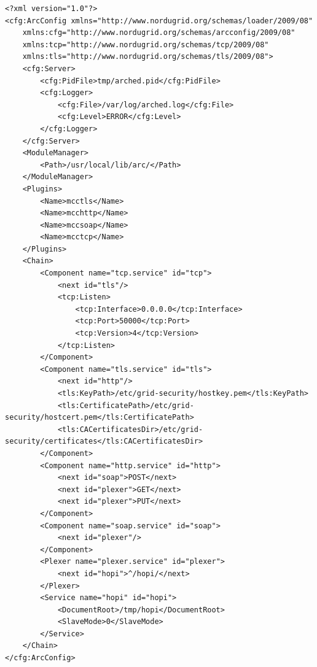 \documentclass{article}
\begin{document}
\begin{verbatim}
<?xml version="1.0"?>
<cfg:ArcConfig xmlns="http://www.nordugrid.org/schemas/loader/2009/08"
	xmlns:cfg="http://www.nordugrid.org/schemas/arcconfig/2009/08"
	xmlns:tcp="http://www.nordugrid.org/schemas/tcp/2009/08"
	xmlns:tls="http://www.nordugrid.org/schemas/tls/2009/08">
    <cfg:Server>
        <cfg:PidFile>tmp/arched.pid</cfg:PidFile>
        <cfg:Logger>
            <cfg:File>/var/log/arched.log</cfg:File>
            <cfg:Level>ERROR</cfg:Level>
        </cfg:Logger>
    </cfg:Server>
    <ModuleManager>
        <Path>/usr/local/lib/arc/</Path>
    </ModuleManager>
    <Plugins>
        <Name>mcctls</Name>
        <Name>mcchttp</Name>
        <Name>mccsoap</Name>
        <Name>mcctcp</Name>
    </Plugins>
    <Chain>
        <Component name="tcp.service" id="tcp">
            <next id="tls"/>
            <tcp:Listen>
                <tcp:Interface>0.0.0.0</tcp:Interface>
                <tcp:Port>50000</tcp:Port>
                <tcp:Version>4</tcp:Version>
            </tcp:Listen>
        </Component>
        <Component name="tls.service" id="tls">
            <next id="http"/>
            <tls:KeyPath>/etc/grid-security/hostkey.pem</tls:KeyPath>
            <tls:CertificatePath>/etc/grid-security/hostcert.pem</tls:CertificatePath>
            <tls:CACertificatesDir>/etc/grid-security/certificates</tls:CACertificatesDir>
        </Component>
        <Component name="http.service" id="http">
            <next id="soap">POST</next>
            <next id="plexer">GET</next>
            <next id="plexer">PUT</next>
        </Component>
        <Component name="soap.service" id="soap">
            <next id="plexer"/>
        </Component>
        <Plexer name="plexer.service" id="plexer">
            <next id="hopi">^/hopi/</next>
        </Plexer>
        <Service name="hopi" id="hopi">
            <DocumentRoot>/tmp/hopi</DocumentRoot>
            <SlaveMode>0</SlaveMode>
        </Service>
    </Chain>
</cfg:ArcConfig>
\end{verbatim}
\end{document}
